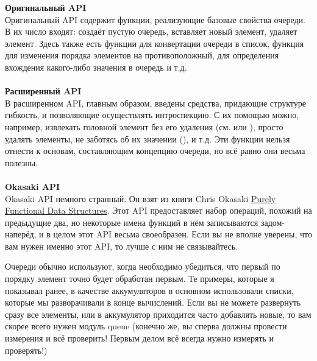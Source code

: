 \begin{minipage}{1.0\linewidth}
    \textbf{Оригинальный API}\\
    Оригинальный API содержит функции, реализующие базовые свойства очереди.
    В их число входят:  создаёт пустую очередь,  вставляет новый элемент,  удаляет элемент. Здесь также есть функции для конвертации очереди в список, функция для изменения порядка элементов на противоположный, для определения вхождения какого\--либо значения в очередь и т.д.\\
    \\
    \textbf{Расширенный API}\\
    В расширенном API, главным образом, введены средства, придающие структуре гибкость, и позволяющие осуществлять интроспекцию.
    С их помощью можно, например, извлекать головной элемент без его удаления (см.  или ), просто удалять элементы, не заботясь об их значении (), и т.д.
    Эти функции нельзя отнести к основам, составляющим концепцию очереди, но всё равно они весьма полезны.\\
    \\
    \textbf{Okasaki API}\\
    Okasaki API немного странный.
    Он взят из книги Chris Okasaki \href{http://books.google.ca/books?id=SxPzSTcTalAC&lpg=PP1&dq=chris\%20okasaki\%20purely\%20functional\%20data\%20structures&pg=PP1\#v=onepage&q=&f=false}{Purely Functional Data Structures}.
    Этот API предоставляет набор операций, похожий на предыдущие два, но некоторые имена функций в нём записываются задом\--наперёд, и в целом этот API весьма своеобразен.
    Если вы не вполне уверены, что вам нужен именно этот API, то лучше с ним не связывайтесь.\\
\end{minipage}

Очереди обычно используют, когда необходимо убедиться, что первый по порядку элемент точно будет обработан первым.
Те примеры, которые я показывал ранее, в качестве аккумуляторов в основном использовали списки, которые мы разворачивали в конце вычислений.
Если вы не можете развернуть сразу все элементы, или в аккумулятор приходится часто добавлять новые, то вам скорее всего нужен модуль queue (конечно же, вы сперва должны провести измерения и всё проверить!
Первым делом всё всегда нужно измерять и проверять!)
